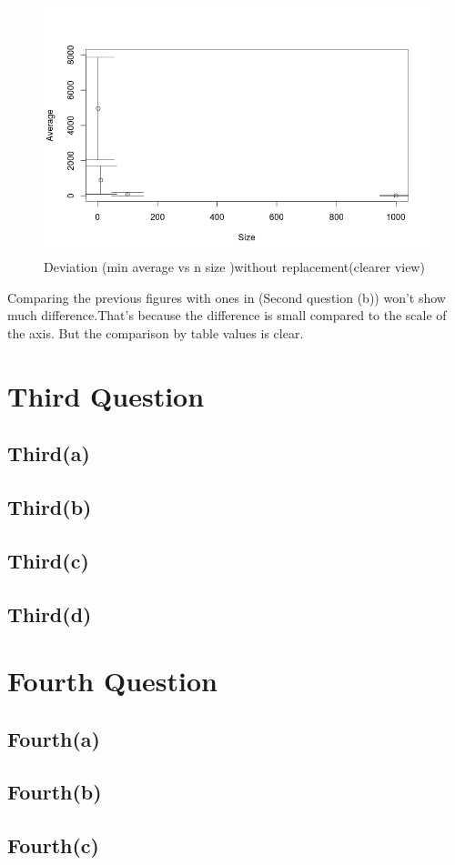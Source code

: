 \documentclass{article}
\begin{document}
	\begin{figure}[H]
		\begin{center}
			\includegraphics[scale=0.7]{plotmin4no.png}
		\end{center}
		\caption{Deviation (min average vs n size )without replacement(clearer view)}
	\end{figure}
	Comparing the previous figures with ones in (Second question (b)) won't show much difference.That's because the difference is small compared to the scale of the axis. But the comparison by table values is clear.
	\section*{Third Question}
	\subsection*{Third(a)}
	\subsection*{Third(b)}
	\subsection*{Third(c)}
	\subsection*{Third(d)}
	\section*{Fourth Question}
	\subsection*{Fourth(a)}
	\subsection*{Fourth(b)}
	\subsection*{Fourth(c)}
\end{document}
